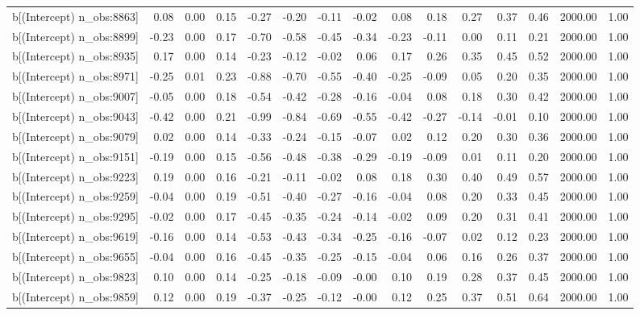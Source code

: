 \begin{table}[ht]
\begin{tabular}{rrrrrrrrrrrrrrr}
  b[(Intercept) n\_obs:8863] & 0.08 & 0.00 & 0.15 & -0.27 & -0.20 & -0.11 & -0.02 & 0.08 & 0.18 & 0.27 & 0.37 & 0.46 & 2000.00 & 1.00 \\ 
  b[(Intercept) n\_obs:8899] & -0.23 & 0.00 & 0.17 & -0.70 & -0.58 & -0.45 & -0.34 & -0.23 & -0.11 & 0.00 & 0.11 & 0.21 & 2000.00 & 1.00 \\ 
  b[(Intercept) n\_obs:8935] & 0.17 & 0.00 & 0.14 & -0.23 & -0.12 & -0.02 & 0.06 & 0.17 & 0.26 & 0.35 & 0.45 & 0.52 & 2000.00 & 1.00 \\ 
  b[(Intercept) n\_obs:8971] & -0.25 & 0.01 & 0.23 & -0.88 & -0.70 & -0.55 & -0.40 & -0.25 & -0.09 & 0.05 & 0.20 & 0.35 & 2000.00 & 1.00 \\ 
  b[(Intercept) n\_obs:9007] & -0.05 & 0.00 & 0.18 & -0.54 & -0.42 & -0.28 & -0.16 & -0.04 & 0.08 & 0.18 & 0.30 & 0.42 & 2000.00 & 1.00 \\ 
  b[(Intercept) n\_obs:9043] & -0.42 & 0.00 & 0.21 & -0.99 & -0.84 & -0.69 & -0.55 & -0.42 & -0.27 & -0.14 & -0.01 & 0.10 & 2000.00 & 1.00 \\ 
  b[(Intercept) n\_obs:9079] & 0.02 & 0.00 & 0.14 & -0.33 & -0.24 & -0.15 & -0.07 & 0.02 & 0.12 & 0.20 & 0.30 & 0.36 & 2000.00 & 1.00 \\ 
  b[(Intercept) n\_obs:9151] & -0.19 & 0.00 & 0.15 & -0.56 & -0.48 & -0.38 & -0.29 & -0.19 & -0.09 & 0.01 & 0.11 & 0.20 & 2000.00 & 1.00 \\ 
  b[(Intercept) n\_obs:9223] & 0.19 & 0.00 & 0.16 & -0.21 & -0.11 & -0.02 & 0.08 & 0.18 & 0.30 & 0.40 & 0.49 & 0.57 & 2000.00 & 1.00 \\ 
  b[(Intercept) n\_obs:9259] & -0.04 & 0.00 & 0.19 & -0.51 & -0.40 & -0.27 & -0.16 & -0.04 & 0.08 & 0.20 & 0.33 & 0.45 & 2000.00 & 1.00 \\ 
  b[(Intercept) n\_obs:9295] & -0.02 & 0.00 & 0.17 & -0.45 & -0.35 & -0.24 & -0.14 & -0.02 & 0.09 & 0.20 & 0.31 & 0.41 & 2000.00 & 1.00 \\ 
  b[(Intercept) n\_obs:9619] & -0.16 & 0.00 & 0.14 & -0.53 & -0.43 & -0.34 & -0.25 & -0.16 & -0.07 & 0.02 & 0.12 & 0.23 & 2000.00 & 1.00 \\ 
  b[(Intercept) n\_obs:9655] & -0.04 & 0.00 & 0.16 & -0.45 & -0.35 & -0.25 & -0.15 & -0.04 & 0.06 & 0.16 & 0.26 & 0.37 & 2000.00 & 1.00 \\ 
  b[(Intercept) n\_obs:9823] & 0.10 & 0.00 & 0.14 & -0.25 & -0.18 & -0.09 & -0.00 & 0.10 & 0.19 & 0.28 & 0.37 & 0.45 & 2000.00 & 1.00 \\ 
  b[(Intercept) n\_obs:9859] & 0.12 & 0.00 & 0.19 & -0.37 & -0.25 & -0.12 & -0.00 & 0.12 & 0.25 & 0.37 & 0.51 & 0.64 & 2000.00 & 1.00 \\ 

\end{tabular}
\end{table}
